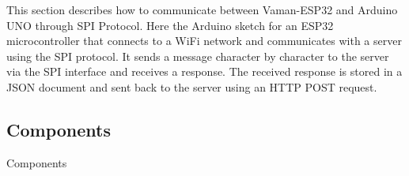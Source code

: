 This section describes how to communicate between Vaman-ESP32 and Arduino UNO
through SPI Protocol. Here the Arduino sketch for an ESP32 microcontroller that 
connects to a WiFi network and communicates with a server using the SPI 
protocol. It sends a message character by character to the server via the SPI 
interface and receives a response. The received response is stored in a JSON 
document and sent back to the server using an HTTP POST request.
\subsection{Components}

\begin{table}[!ht]
\centering

\caption{Components}
\label{table:spi-components}
\end{table}

